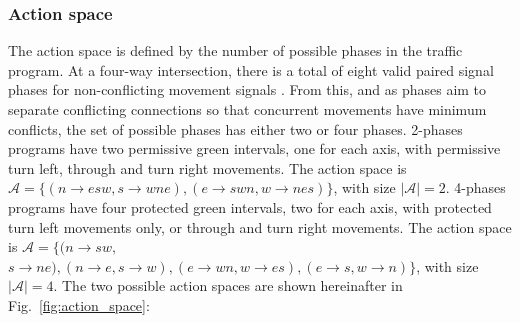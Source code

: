 \documentclass[journal]{IEEEtran}
\begin{document}
\subsubsection{Action space}
The action space is defined by the number of possible phases in the traffic program. At a four-way intersection, there is a total of eight valid paired signal phases for non-conflicting movement signals \cite{wei2020survey}. From this, and as phases aim to separate conflicting connections so that concurrent movements have minimum conflicts, the set of possible phases has either two or four phases. 2-phases programs have two permissive green intervals, one for each axis, with permissive turn left, through and turn right movements. The action space is $\mathcal{A}=\{(n\rightarrow esw,s\rightarrow wne),(e\rightarrow swn,w\rightarrow nes)\}$, with size $|\mathcal{A}|=2$. 4-phases programs have four protected green intervals, two for each axis, with protected turn left movements only, or through and turn right movements. The action space is $\mathcal{A}=\{(n\rightarrow sw,$ $s\rightarrow ne),(n\rightarrow e,s\rightarrow w),(e\rightarrow wn,w\rightarrow es),(e\rightarrow s,w\rightarrow n)\}$, with size $|\mathcal{A}|=4$.
The two possible action spaces are shown hereinafter in Fig.~\ref{fig:action_space}:
\end{document}
